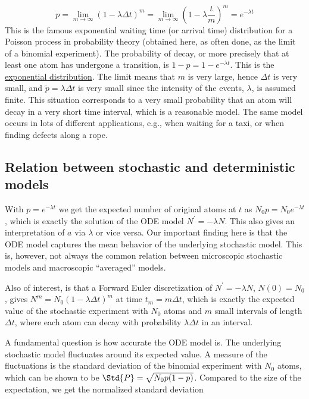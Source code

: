 \documentclass[graybox,sectrefs,envcountresetchap,open=right,final]{svmonodo}
\begin{document}
\[ p = \lim_{m\rightarrow\infty} (1-\lambda\Delta t)^m
= \lim_{m\rightarrow\infty} \left(1-\lambda\frac{t}{m}\right)^m = e^{-\lambda t}
\]
This is the famous exponential waiting time (or arrival time) distribution for a
Poisson process in probability theory (obtained here, as often done, as
the limit of a binomial experiment). The probability of decay, or more
precisely that at least one atom has undergone a transition, is
$1-p= 1-e^{-\lambda t}$. This is the
\href{{http://en.wikipedia.org/wiki/Exponential_distribution}}{exponential distribution}.
The limit means that $m$ is very
large, hence $\Delta t$ is very small, and $\tilde p=\lambda\Delta t$
is very small since the intensity of the events, $\lambda$, is assumed
finite. This situation corresponds to a very small probability
that an atom will decay in a very short time interval, which is a
reasonable model.
The same model occurs in lots of different applications, e.g.,
when waiting for a taxi, or when finding defects along a rope.

\subsection{Relation between stochastic and deterministic models}

With $p=e^{-\lambda t}$ we get the expected number of original atoms
at $t$ as $N_0p=N_0e^{-\lambda t}$, which is exactly the solution of
the ODE model $N^{\prime}=-\lambda N$. This also gives an interpretation
of $a$ via $\lambda$ or vice versa. Our important finding here
is that the ODE model
captures the mean behavior of the underlying stochastic model. This
is, however, not always the common relation between microscopic stochastic
models and macroscopic ``averaged'' models.

Also of interest, is that a Forward Euler discretization of
$N^{\prime}=-\lambda N$, $N(0)=N_0$, gives $N^m = N_0(1-\lambda\Delta t)^m$
at time $t_m=m\Delta t$, which is exactly the
expected value of the stochastic experiment with $N_0$ atoms
and $m$ small intervals of length $\Delta t$, where each atom can
decay with probability $\lambda\Delta t$ in an interval.

A fundamental question is how accurate the ODE model is. The underlying
stochastic model fluctuates around its expected value. A measure
of the fluctuations is the standard deviation of the binomial experiment with
$N_0$ atoms, which can be shown to be $\Std{P}=\sqrt{N_0p(1-p)}$. Compared
to the size of the expectation, we get
the normalized standard deviation
\end{document}
